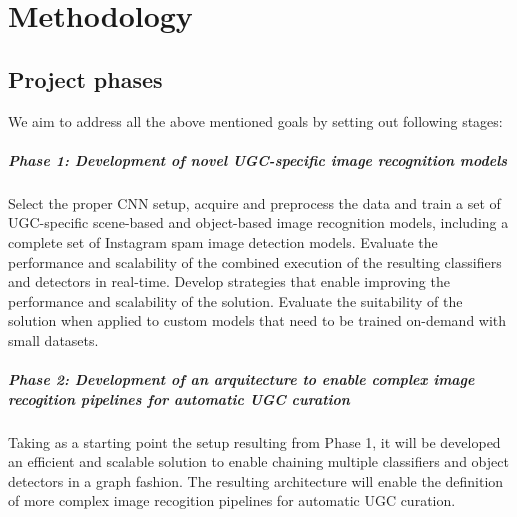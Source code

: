\chapter{Methodology}

\ifpdf
    \graphicspath{{Chapter3/Figs/Raster/}{Chapter3/Figs/PDF/}{Chapter3/Figs/}}
\else
    \graphicspath{{Chapter3/Figs/Vector/}{Chapter3/Figs/}}
\fi

\section{Project phases}
We aim to address all the above mentioned goals by setting out following stages:

\paragraph{Phase 1: Development of novel UGC-specific image recognition models}

Select the proper CNN setup, acquire and preprocess the data and train a set of UGC-specific scene-based and object-based image recognition models, including a complete set of Instagram spam image detection models. Evaluate the performance and scalability of the combined execution of the resulting classifiers and detectors in real-time. Develop strategies that enable improving the performance and scalability of the solution. Evaluate the suitability of the solution when applied to custom models that need to be trained on-demand with small datasets.

\paragraph{Phase 2: Development of an arquitecture to enable complex image recogition pipelines for automatic UGC curation}

Taking as a starting point the setup resulting from Phase 1, it will be developed an efficient and scalable solution to enable chaining multiple classifiers and object detectors in a graph fashion. The resulting architecture will enable the definition of more complex image recogition pipelines for automatic UGC curation. 

